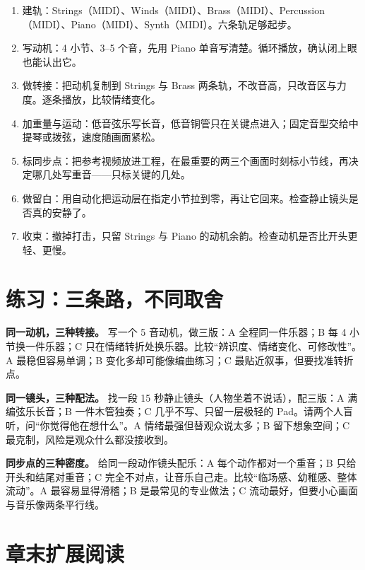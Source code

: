 \begin{enumerate}
\item 建轨：Strings（MIDI）、Winds（MIDI）、Brass（MIDI）、Percussion（MIDI）、Piano（MIDI）、Synth（MIDI）。六条轨足够起步。
\item 写动机：4 小节、3--5 个音，先用 Piano 单音写清楚。循环播放，确认闭上眼也能认出它。
\item 做转接：把动机复制到 Strings 与 Brass 两条轨，不改音高，只改音区与力度。逐条播放，比较情绪变化。
\item 加重量与运动：低音弦乐写长音，低音铜管只在关键点进入；固定音型交给中提琴或拨弦，速度随画面紧松。
\item 标同步点：把参考视频放进工程，在最重要的两三个画面时刻标小节线，再决定哪几处写重音——只标关键的几处。
\item 做留白：用自动化把运动层在指定小节拉到零，再让它回来。检查静止镜头是否真的安静了。
\item 收束：撤掉打击，只留 Strings 与 Piano 的动机余韵。检查动机是否比开头更轻、更慢。
\end{enumerate}

\section{练习：三条路，不同取舍}
\label{sec:film-practice}

\begin{exercise}
\textbf{同一动机，三种转接。} 写一个 5 音动机，做三版：A 全程同一件乐器；B 每 4 小节换一件乐器；C 只在情绪转折处换乐器。比较“辨识度、情绪变化、可修改性”。A 最稳但容易单调；B 变化多却可能像编曲练习；C 最贴近叙事，但要找准转折点。
\end{exercise}

\begin{exercise}
\textbf{同一镜头，三种配法。} 找一段 15 秒静止镜头（人物坐着不说话），配三版：A 满编弦乐长音；B 一件木管独奏；C 几乎不写、只留一层极轻的 Pad。请两个人盲听，问“你觉得他在想什么”。A 情绪最强但替观众说太多；B 留下想象空间；C 最克制，风险是观众什么都没接收到。
\end{exercise}

\begin{exercise}
\textbf{同步点的三种密度。} 给同一段动作镜头配乐：A 每个动作都对一个重音；B 只给开头和结尾对重音；C 完全不对点，让音乐自己走。比较“临场感、幼稚感、整体流动”。A 最容易显得滑稽；B 是最常见的专业做法；C 流动最好，但要小心画面与音乐像两条平行线。
\end{exercise}

\section{章末扩展阅读}
\label{sec:film-reading}

